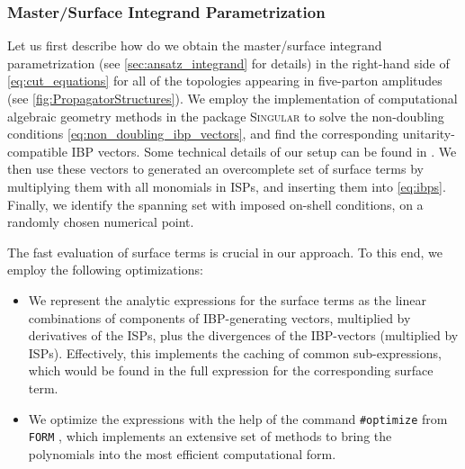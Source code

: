 \subsubsection{Master/Surface Integrand Parametrization}

Let us first describe how do we obtain the master/surface integrand parametrization (see \cref{sec:ansatz_integrand} for details)
in the right-hand  side of \cref{eq:cut_equations} for all of the topologies appearing in five-parton amplitudes (see \cref{fig:PropagatorStructures}).
We employ the implementation of computational algebraic geometry methods in the package \textsc{Singular} \cite{DGPS}
to solve the non-doubling conditions \eqref{eq:non_doubling_ibp_vectors},
and find the corresponding unitarity-compatible IBP vectors.
Some technical details of our setup can be found in \cite{Abreu:2017hqn}.
We then use these vectors to generated an overcomplete set of surface terms by multiplying
them with all monomials in ISPs, and inserting them into \cref{eq:ibps}.
Finally, we identify the spanning set with imposed on-shell conditions, on a randomly chosen numerical 
point.


The fast evaluation of surface terms is crucial in our approach.
To this end, we employ the following optimizations:
\begin{itemize}
  \item We represent the analytic expressions for the surface terms
    as the linear combinations of components of IBP-generating vectors, multiplied by derivatives of the ISPs,
    plus the divergences of the IBP-vectors (multiplied by ISPs). 
    Effectively, this implements the caching of common sub-expressions, which would be found in the full expression for the corresponding surface term.
  \item We optimize the expressions with the help of the command \texttt{\#optimize} from \texttt{FORM} \cite{Vermaseren:2000nd},
    which implements an extensive set of methods to bring the polynomials into the most efficient computational form.
\end{itemize}

